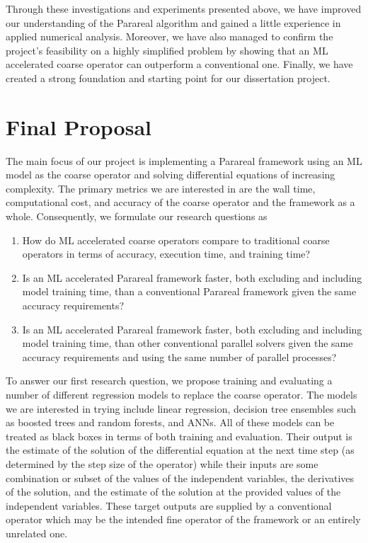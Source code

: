 \documentclass{article}
\begin{document}
Through these investigations and experiments presented above, we have improved our understanding of the Parareal algorithm and gained a little experience in applied numerical analysis. Moreover, we have also managed to confirm the project's feasibility on a highly simplified problem by showing that an ML accelerated coarse operator can outperform a conventional one. Finally, we have created a strong foundation and starting point for our dissertation project.

\section{Final Proposal}

The main focus of our project is implementing a Parareal framework using an ML model as the coarse operator and solving differential equations of increasing complexity. The primary metrics we are interested in are the wall time, computational cost, and accuracy of the coarse operator and the framework as a whole. Consequently, we formulate our research questions as

\begin{enumerate}
    \item How do ML accelerated coarse operators compare to traditional coarse operators in terms of accuracy, execution time, and training time?
    \item Is an ML accelerated Parareal framework faster, both excluding and including model training time, than a conventional Parareal framework given the same accuracy requirements?
    \item Is an ML accelerated Parareal framework faster, both excluding and including model training time, than other conventional parallel solvers given the same accuracy requirements and using the same number of parallel processes?
\end{enumerate}

To answer our first research question, we propose training and evaluating a number of different regression models to replace the coarse operator. The models we are interested in trying include linear regression, decision tree ensembles such as boosted trees and random forests, and ANNs. All of these models can be treated as black boxes in terms of both training and evaluation. Their output is the estimate of the solution of the differential equation at the next time step (as determined by the step size of the operator) while their inputs are some combination or subset of the values of the independent variables, the derivatives of the solution, and the estimate of the solution at the provided values of the independent variables. These target outputs are supplied by a conventional operator which may be the intended fine operator of the framework or an entirely unrelated one.
\end{document}
